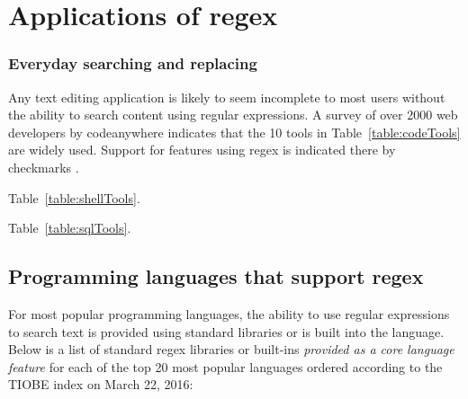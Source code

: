 \section{Applications of regex}
\subsubsection{Everyday searching and replacing}


Any text editing application is likely to seem incomplete to most users without the ability to search content using regular expressions.  A survey of over 2000 web developers by codeanywhere indicates that the 10 tools in Table~\ref{table:codeTools} are widely used.  Support for features using regex is indicated there by checkmarks .


 Table~\ref{table:shellTools}.


 Table~\ref{table:sqlTools}.



\subsection{Programming languages that support regex}

For most popular programming languages, the ability to use regular expressions to search text is provided using standard libraries or is built into the language.  Below is a list of standard regex libraries or built-ins \emph{provided as a core language feature} for each of the top 20 most popular languages ordered according to the TIOBE index on March 22, 2016:

